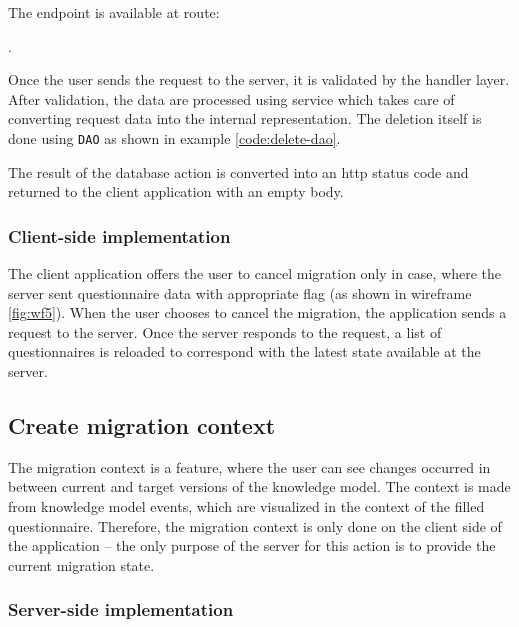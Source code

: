 The endpoint is available at route:

\begin{center}
    .
\end{center}

Once the user sends the request to the server, it is validated by the handler layer.
After validation, the data are processed using service which takes care of converting request data into the internal representation.
The deletion itself is done using \texttt{DAO} as shown in example \ref{code:delete-dao}.


The result of the database action is converted into an \gls{http} status code and returned to the client application with an empty body.

\subsubsection*{Client-side implementation}

The client application offers the user to cancel migration only in case, where the server sent questionnaire data with appropriate flag (as shown in wireframe \ref{fig:wf5}).
When the user chooses to cancel the migration, the application sends a request to the server.
Once the server responds to the request, a list of questionnaires is reloaded to correspond with the latest state available at the server.

\subsection{Create migration context}\label{sec:create-migration-context}

The migration context is a feature, where the user can see changes occurred in between current and target versions of the knowledge model.
The context is made from knowledge model events, which are visualized in the context of the filled questionnaire.
Therefore, the migration context is only done on the client side of the application -- the only purpose of the server for this action is to provide the current migration state.

\subsubsection*{Server-side implementation}

